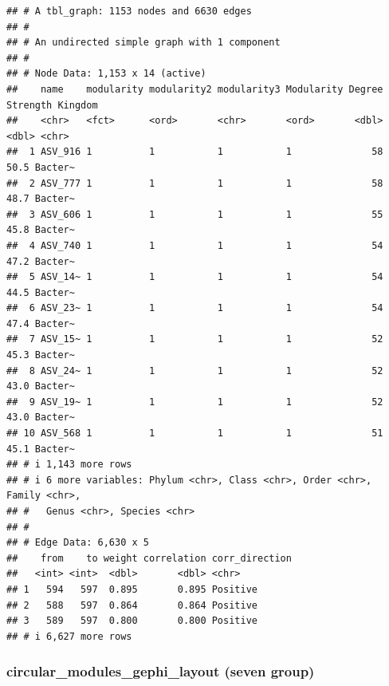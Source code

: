 \documentclass[
]{book}
\newenvironment{Shaded}{\begin{snugshade}}{\end{snugshade}}
\newcommand{\NormalTok}[1]{#1}
\newcommand{\SpecialCharTok}[1]{\textcolor[rgb]{0.81,0.36,0.00}{\textbf{#1}}}
\begin{document}
\begin{Shaded}
\end{Shaded}

\begin{verbatim}
## # A tbl_graph: 1153 nodes and 6630 edges
## #
## # An undirected simple graph with 1 component
## #
## # Node Data: 1,153 x 14 (active)
##    name    modularity modularity2 modularity3 Modularity Degree Strength Kingdom
##    <chr>   <fct>      <ord>       <chr>       <ord>       <dbl>    <dbl> <chr>  
##  1 ASV_916 1          1           1           1              58     50.5 Bacter~
##  2 ASV_777 1          1           1           1              58     48.7 Bacter~
##  3 ASV_606 1          1           1           1              55     45.8 Bacter~
##  4 ASV_740 1          1           1           1              54     47.2 Bacter~
##  5 ASV_14~ 1          1           1           1              54     44.5 Bacter~
##  6 ASV_23~ 1          1           1           1              54     47.4 Bacter~
##  7 ASV_15~ 1          1           1           1              52     45.3 Bacter~
##  8 ASV_24~ 1          1           1           1              52     43.0 Bacter~
##  9 ASV_19~ 1          1           1           1              52     43.0 Bacter~
## 10 ASV_568 1          1           1           1              51     45.1 Bacter~
## # i 1,143 more rows
## # i 6 more variables: Phylum <chr>, Class <chr>, Order <chr>, Family <chr>,
## #   Genus <chr>, Species <chr>
## #
## # Edge Data: 6,630 x 5
##    from    to weight correlation corr_direction
##   <int> <int>  <dbl>       <dbl> <chr>         
## 1   594   597  0.895       0.895 Positive      
## 2   588   597  0.864       0.864 Positive      
## 3   589   597  0.800       0.800 Positive      
## # i 6,627 more rows
\end{verbatim}

\subsubsection{circular\_modules\_gephi\_layout (seven group)}\label{circular_modules_gephi_layout-seven-group}
\end{document}

